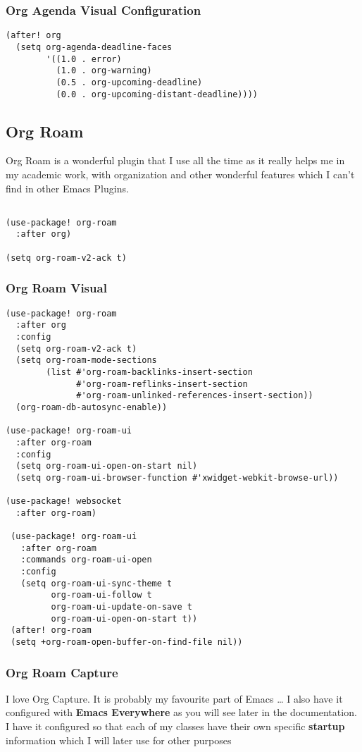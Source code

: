 \documentclass[11pt]{article}
\begin{document}
\subsubsection{Org Agenda Visual Configuration}
\label{sec:org5428fe6}
\begin{verbatim}
(after! org
  (setq org-agenda-deadline-faces
        '((1.0 . error)
          (1.0 . org-warning)
          (0.5 . org-upcoming-deadline)
          (0.0 . org-upcoming-distant-deadline))))
\end{verbatim}
\subsection{Org Roam}
\label{sec:orgb875844}
Org Roam is a wonderful plugin that I use all the time as it really helps me in my academic work, with organization and other wonderful features which I can't find in other Emacs Plugins.
\begin{verbatim}

(use-package! org-roam
  :after org)

(setq org-roam-v2-ack t)
\end{verbatim}
\subsubsection{Org Roam Visual}
\label{sec:orgd49f668}
\begin{verbatim}
(use-package! org-roam
  :after org
  :config
  (setq org-roam-v2-ack t)
  (setq org-roam-mode-sections
        (list #'org-roam-backlinks-insert-section
              #'org-roam-reflinks-insert-section
              #'org-roam-unlinked-references-insert-section))
  (org-roam-db-autosync-enable))

(use-package! org-roam-ui
  :after org-roam
  :config
  (setq org-roam-ui-open-on-start nil)
  (setq org-roam-ui-browser-function #'xwidget-webkit-browse-url))

(use-package! websocket
  :after org-roam)

 (use-package! org-roam-ui
   :after org-roam
   :commands org-roam-ui-open
   :config
   (setq org-roam-ui-sync-theme t
         org-roam-ui-follow t
         org-roam-ui-update-on-save t
         org-roam-ui-open-on-start t))
 (after! org-roam
 (setq +org-roam-open-buffer-on-find-file nil))
\end{verbatim}
\subsubsection{Org Roam Capture}
\label{sec:org0fe332e}
I love Org Capture. It is probably my favourite part of Emacs \ldots{} I also have it configured with \textbf{Emacs Everywhere} as you will see later in the documentation. I have it configured so that each of my classes have their own specific \textbf{startup} information which I will later use for other purposes
\end{document}
